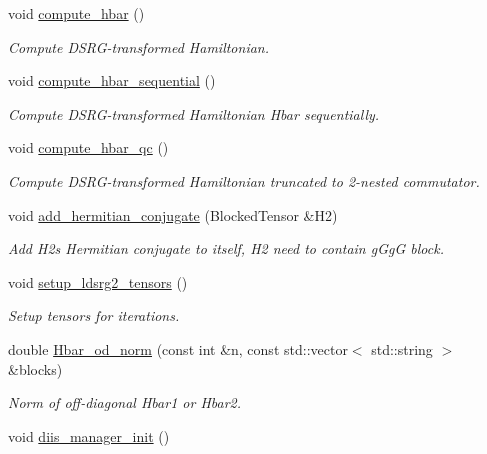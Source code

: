 \begin{DoxyCompactItemize}
void \mbox{\hyperlink{classforte_1_1_s_a___m_r_d_s_r_g_a566e6e3e85fd801f686c8a914ce1d299}{compute\+\_\+hbar}} ()
\begin{DoxyCompactList}\small\item\em Compute D\+S\+R\+G-\/transformed Hamiltonian. \end{DoxyCompactList}\item 
void \mbox{\hyperlink{classforte_1_1_s_a___m_r_d_s_r_g_a62d216d6b5c63c063ff08592b1577168}{compute\+\_\+hbar\+\_\+sequential}} ()
\begin{DoxyCompactList}\small\item\em Compute D\+S\+R\+G-\/transformed Hamiltonian Hbar sequentially. \end{DoxyCompactList}\item 
void \mbox{\hyperlink{classforte_1_1_s_a___m_r_d_s_r_g_aa849913860f8d288e8965d344ad5bde2}{compute\+\_\+hbar\+\_\+qc}} ()
\begin{DoxyCompactList}\small\item\em Compute D\+S\+R\+G-\/transformed Hamiltonian truncated to 2-\/nested commutator. \end{DoxyCompactList}\item 
void \mbox{\hyperlink{classforte_1_1_s_a___m_r_d_s_r_g_a153640f5e5ec409c606e501faee09980}{add\+\_\+hermitian\+\_\+conjugate}} (Blocked\+Tensor \&H2)
\begin{DoxyCompactList}\small\item\em Add H2\textquotesingle{}s Hermitian conjugate to itself, H2 need to contain g\+GgG block. \end{DoxyCompactList}\item 
void \mbox{\hyperlink{classforte_1_1_s_a___m_r_d_s_r_g_a661dbb711b0d741ad8627c457207e9bc}{setup\+\_\+ldsrg2\+\_\+tensors}} ()
\begin{DoxyCompactList}\small\item\em Setup tensors for iterations. \end{DoxyCompactList}\item 
double \mbox{\hyperlink{classforte_1_1_s_a___m_r_d_s_r_g_a38f2d6f9c2bf0e949c0651a9c1774314}{Hbar\+\_\+od\+\_\+norm}} (const int \&n, const std\+::vector$<$ std\+::string $>$ \&blocks)
\begin{DoxyCompactList}\small\item\em Norm of off-\/diagonal Hbar1 or Hbar2. \end{DoxyCompactList}\item 
void \mbox{\hyperlink{classforte_1_1_s_a___m_r_d_s_r_g_aad910f6c870ef3a13f6e4aadf322a9a5}{diis\+\_\+manager\+\_\+init}} ()

\end{DoxyCompactItemize}
